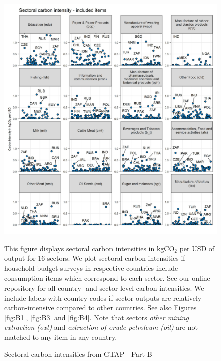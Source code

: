 \documentclass[12pt, a4paper]{article}
\newenvironment{subcaption}
{\strut
\vspace{-5pt}
\begin{minipage}[b]{0.9\textwidth}
  \hspace*{-\parindent}
  \footnotesize}
 {\end{minipage}}
\begin{document}
\begin{figure}[ht!]
  \centering
  \caption{Sectoral carbon intensities from GTAP - Part B} \label{fig:B2}
  \includegraphics{Analysis_Carbon_Intensities_GTAP/Figure_2.1.1_B_2017}
  \begin{subcaption}
    This figure displays sectoral carbon intensities in kgCO$_{2}$ per USD of output for 16 sectors. We plot sectoral carbon intensities if household budget surveys in respective countries include consumption items which correspond to each sector. See our online repository for all country- and sector-level carbon intensities. We include labels with country codes if sector outputs are relatively carbon-intensive compared to other countries. See also Figures \ref{fig:B1}, \ref{fig:B3} and \ref{fig:B4}. Note that sectors \textit{other mining extraction (oxt)} and \textit{extraction of crude petroleum (oil)} are not matched to any item in any country.
  \end{subcaption}

\end{figure}

\clearpage
\end{document}
